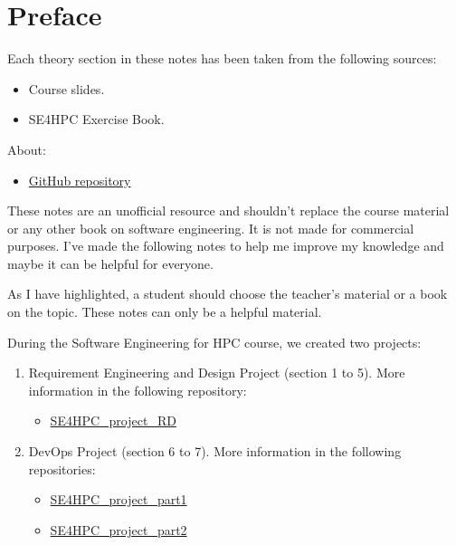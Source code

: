 \section*{Preface}

Each theory section in these notes has been taken from the following sources:
\begin{itemize}
    \item Course slides.\cite{slides}
    \item SE4HPC Exercise Book.\cite{exerciseBook}
\end{itemize}
About:
\begin{itemize}
    \item[\faIcon{github}] \href{https://github.com/PoliMI-HPC-E-notes-projects-AndreVale69/HPC-E-PoliMI-university-notes}{GitHub repository}
\end{itemize}
These notes are an unofficial resource and shouldn't replace the course material or any other book on software engineering. It is not made for commercial purposes. I've made the following notes to help me improve my knowledge and maybe it can be helpful for everyone.

As I have highlighted, a student should choose the teacher's material or a book on the topic. These notes can only be a helpful material.

\highspace
During the Software Engineering for HPC course, we created two projects:
\begin{enumerate}
    \item Requirement Engineering and Design Project (section 1 to 5). More information in the following repository:
    \begin{itemize}
        \item[\faIcon{github}] \href{https://github.com/PoliMI-HPC-E-notes-projects-AndreVale69/SE4HPC_project_RD}{SE4HPC\_project\_RD}
    \end{itemize}
    
    \item DevOps Project (section 6 to 7). More information in the following repositories:
    \begin{itemize}
        \item[\faIcon{github}] \href{https://github.com/PoliMI-HPC-E-notes-projects-AndreVale69/SE4HPC_project_part1}{SE4HPC\_project\_part1}
        
        \item[\faIcon{github}] \href{https://github.com/PoliMI-HPC-E-notes-projects-AndreVale69/SE4HPC_project_part2}{SE4HPC\_project\_part2}
    \end{itemize}
\end{enumerate}